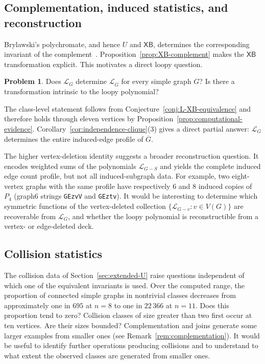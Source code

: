 \documentclass[11pt]{article}
\theoremstyle{plain}
\theoremstyle{definition}
\newtheorem{problem}[theorem]{Problem}
\renewcommand{\mathcal}{\mathscr}
\newcommand{\LL}{\mathcal{L}}    %
\newcommand{\XB}{\mathsf{XB}} %
\numberwithin{equation}{section}
\begin{document}
\subsection{Complementation, induced statistics, and reconstruction}
\label{subsec:outlook-complementation}

Brylawski's polychromate, and hence $U$ and $\XB$, determines the corresponding
invariant of the complement~\cite{Bry,Nob,Mar}. Proposition~\ref{prop:XB-complement}
makes the $\XB$ transformation explicit.  This motivates a direct loopy question.

\begin{problem}\label{prob:complement}
Does $\LL_G$ determine $\LL_{\overline G}$ for every simple graph $G$?  Is
there a transformation intrinsic to the loopy polynomial?
\end{problem}

The class-level statement follows from Conjecture~\ref{conj:L-XB-equivalence}
and therefore holds through eleven vertices by
Proposition~\ref{prop:computational-evidence}.
Corollary~\ref{cor:independence-clique}(3) gives a direct partial answer:
$\LL_G$ determines the entire induced-edge profile of $\overline G$.

The higher vertex-deletion identity suggests a broader reconstruction question.
It encodes weighted sums of the polynomials $\LL_{G-S}$ and yields
the complete induced edge count profile, but not all induced-subgraph data.
For example, two eight-vertex graphs with the same profile have respectively
$6$ and $8$ induced copies of $P_4$ (graph6 strings
\texttt{GEzvV} and \texttt{GEztv}).  It would be interesting
to determine which symmetric functions of the vertex-deleted collection
$\{\LL_{G-v}:v\in V(G)\}$ are recoverable from $\LL_G$, and whether the loopy
polynomial is reconstructible from a vertex- or edge-deleted deck.

\subsection{Collision statistics}
\label{subsec:outlook-statistics}

The collision data of Section~\ref{sec:extended-U} raise questions independent
of which one of the equivalent invariants is used.  Over the computed range, the
proportion of connected simple graphs in nontrivial classes decreases from
approximately one in $695$ at $n=8$ to one in $22\,366$ at $n=11$.
Does this proportion tend to zero?
Collision classes of size greater than two first occur at ten vertices. Are their sizes bounded?
Complementation and joins generate some larger examples from smaller ones (see  Remark~\ref{rem:complementation}).
It would be useful to identify further operations producing collisions and to understand
to what extent the observed classes are generated from smaller ones.
\end{document}
